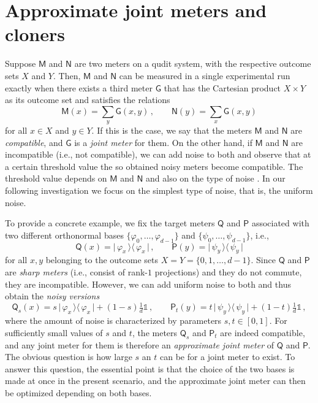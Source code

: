\documentclass[12pt,reqno]{amsart}
\theoremstyle{definition}
\newcommand{\kb}[2]{\vert\,#1\,\rangle\langle\,#2\,\vert} %
\newcommand{\id}{\mathds{1}} %
\newcommand{\Mo}{\mathsf{M}}%
\newcommand{\Qo}{\mathsf{Q}}%
\newcommand{\Po}{\mathsf{P}}%
\newcommand{\No}{\mathsf{N}}%
\newcommand{\Go}{\mathsf{G}}%
\newcommand{\phii}{\varphi} %
\begin{document}
\section{Approximate joint meters and cloners}\label{sec:joint}

Suppose $\Mo$ and $\No$ are two meters on a qudit system, with the respective outcome sets $X$ and $Y$. Then, $\Mo$ and $\No$ can be measured in a single experimental run exactly when there exists a third meter $\Go$ that has the Cartesian product $X\times Y$ as its outcome set and satisfies the relations
\begin{equation} %
\Mo(x) = \sum_y\Go(x,y)\,,\qquad \No(y) = \sum_x\Go(x,y)
\end{equation}
for all $x\in X$ and $y\in Y$. If this is the case, we say that the meters $\Mo$ and $\No$ are \emph{compatible}, and $\Go$ is a \emph{joint meter} for them. 
On the other hand, if $\Mo$ and $\No$ are incompatible (i.e., not compatible), we can add noise to both and observe that at a certain threshold value the so obtained noisy meters become compatible. The threshold value depends on $\Mo$ and $\No$ and also on the type of noise \cite{DeFaKa19}. 
In our following investigation we focus on the simplest type of noise, that is, the uniform noise.

To provide a concrete example, we fix the target meters $\Qo$ and $\Po$ associated with two different orthonormal bases $\{\phii_0,\ldots,\phii_{d-1}\}$ and $\{\psi_0,\ldots,\psi_{d-1}\}$, i.e.,
\begin{equation}\label{eq:QP}
\Qo(x)=\kb{\varphi_x}{\varphi_x} \, , \qquad \Po(y)=\kb{\psi_y}{\psi_y}
\end{equation}
for all $x,y$ belonging to the outcome sets $X=Y=\{0,1,\ldots,d-1\}$. 
Since $\Qo$ and $\Po$ are {\em sharp meters} (i.e., consist of rank-$1$ projections) and they do not commute, they are incompatible. 
However, we can add uniform noise to both and thus obtain the {\em noisy versions}
\begin{equation}\label{eq:QsPt}
\Qo_s(x) = s\,\kb{\varphi_x}{\varphi_x} + (1-s)\tfrac{1}{d}\id \,,\qquad \Po_t(y) = t\,\kb{\psi_y}{\psi_y} + (1-t)\tfrac{1}{d}\id\,,
\end{equation}
where the amount of noise is characterized by parameters $s,t\in [0,1]$. For sufficiently small values of $s$ and $t$, the meters $\Qo_s$ and $\Po_t$ are indeed compatible, and any joint meter for them is therefore an \emph{approximate joint meter} of $\Qo$ and $\Po$. 
The obvious question is how large $s$ an $t$ can be for a joint meter to exist. 
To answer this question, the essential point is that the choice of the two bases is made at once in the present scenario, and the approximate joint meter can then be optimized depending on both bases.
\end{document}
